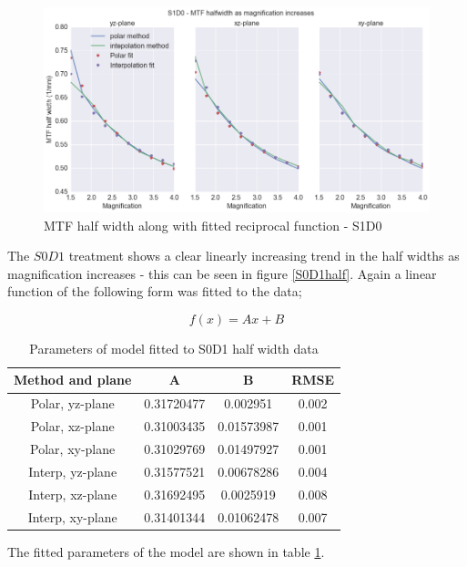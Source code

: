 \documentclass[
  twoside,
  11pt, a4paper,
  footinclude=true,
  headinclude=true,
  cleardoublepage=empty
]{scrbook}
\begin{document}
\begin{figure}[h!]
  \centering
    \includegraphics[width=\textwidth]{code/MTF_and_PSF/MTF_Interp_Polar_Plots_files/MTF_Interp_Polar_Plots_6_0.png}
    \caption{MTF half width along with fitted reciprocal function - S1D0}
        \label{S1D0half}
\end{figure}

The $S0D1$ treatment shows a clear linearly increasing trend in the half widths as magnification increases - this can be seen in figure \ref{S0D1half}. Again a linear function of the following form was fitted to the data;

\[
f(x) = Ax + B
\]


\begin{table}
\caption{Parameters of model fitted to S0D1 half width data}
\label{linhalffit}
\begin{tabular}{c|ccc}
\toprule
{} Method and plane &     A &     B &  RMSE\\
\midrule
Polar, yz-plane         &  0.31720477 & 0.002951    & 0.002\\
Polar, xz-plane        &  0.31003435 & 0.01573987 &  0.001\\
Polar, xy-plane      &  0.31029769 & 0.01497927 &  0.001\\
Interp, yz-plane       &  0.31577521 & 0.00678286 &  0.004\\
Interp, xz-plane       &  0.31692495 & 0.0025919 &  0.008\\
Interp, xy-plane       &  0.31401344 & 0.01062478 &  0.007\\
\bottomrule
\end{tabular}
\end{table}

The fitted parameters of the model are shown in table \ref{linhalffit}.
\end{document}
